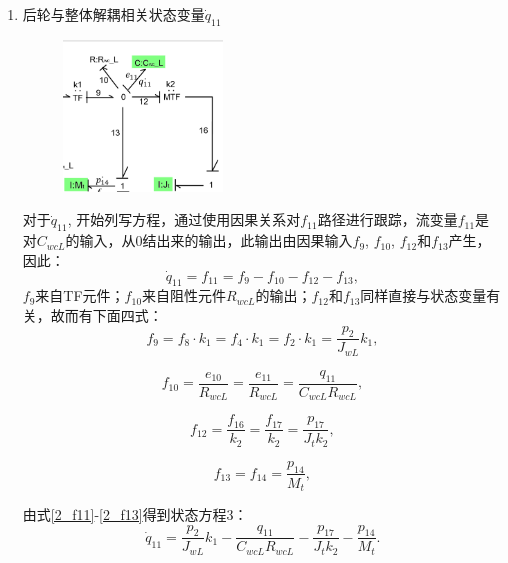 \begin{enumerate}
\item {后轮与整体解耦相关状态变量$\dot{q}_{11}$}
\begin{figure}[h]
	\centering
	\includegraphics[width=0.4\textwidth]{fig/2_equation3.png}
\end{figure}
对于$\dot{q} _ { 11 }$,
开始列写方程，通过使用因果关系对$f_11$路径进行跟踪，流变量$f_11$是对$C_{wcL}$的输入，从0结出来的输出，此输出由因果输入$f _ { 9 }$, $ f _ { 10 }$, $  f _ { 12 }$和$f _ { 13 }$产生，因此：
\begin{equation}\label{2_f11}
\dot{q}_{11}
=
f_{11}
=
f_9 - f_{10} - f_{12} - f_{13},
\end{equation}
$f_9$来自TF元件；$f_{10}$来自阻性元件$R _ { wcL }$的输出；$f_{12}$和$f_{13}$同样直接与状态变量有关，故而有下面四式：
\begin{equation}\label{2_f9}
f_{9}
=
f_{8} \cdot k_1
=
f_{4} \cdot k_1
=
f_{2} \cdot k_1
=
\frac{p_{2}}{J_{w L}} k_{1},
\end{equation}

\begin{equation}\label{2_f10}
f_{10}
=
\frac{e_{10}}{R_{wc L}}
=
\frac{e_{11}}{R_{wc L}}
=
\frac{q_{11}}{C_{wc L} R_{wc L}},
\end{equation}

\begin{equation}\label{2_f12}
f_{12}
=
\frac{f_{16}}{k_{2}} 
=
\frac{f_{17}}{k_{2}} 
=
\frac{p_{17}}{J_{t} k_{2}},
\end{equation}

\begin{equation}\label{2_f13}
f_{13}
=
f_{14}
=
\frac{p_{14}}{M_{t}},
\end{equation}

由式\ref{2_f11}-\ref{2_f13}得到状态方程3：
\begin{equation}\label{2_q11}
\dot{q}_{11}
=
\frac{p_{2}}{J_{w L}} k_{1}
-
\frac{q_{11}}{C_{wc L} R_{wc L}}
-
\frac{p_{17}}{J_{t} k_{2}}
-
\frac{p_{14}}{M_{t}}.
\end{equation}


\end{enumerate}
